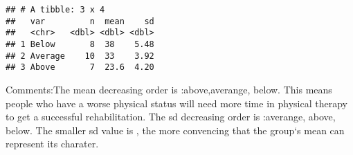 \documentclass[]{article}
\newenvironment{Shaded}{\begin{snugshade}}{\end{snugshade}}
\newcommand{\KeywordTok}[1]{\textcolor[rgb]{0.13,0.29,0.53}{\textbf{#1}}}
\newcommand{\DataTypeTok}[1]{\textcolor[rgb]{0.13,0.29,0.53}{#1}}
\newcommand{\DecValTok}[1]{\textcolor[rgb]{0.00,0.00,0.81}{#1}}
\newcommand{\StringTok}[1]{\textcolor[rgb]{0.31,0.60,0.02}{#1}}
\newcommand{\OtherTok}[1]{\textcolor[rgb]{0.56,0.35,0.01}{#1}}
\newcommand{\OperatorTok}[1]{\textcolor[rgb]{0.81,0.36,0.00}{\textbf{#1}}}
\newcommand{\NormalTok}[1]{#1}
\begin{document}
\begin{Shaded}
\end{Shaded}

\begin{verbatim}
## # A tibble: 3 x 4
##   var         n  mean    sd
##   <chr>   <dbl> <dbl> <dbl>
## 1 Below       8  38    5.48
## 2 Average    10  33    3.92
## 3 Above       7  23.6  4.20
\end{verbatim}

Comments:The mean decreasing order is :above,averange, below. This means
people who have a worse physical status will need more time in physical
therapy to get a successful rehabilitation. The sd decreasing order is
:averange, above, below. The smaller sd value is , the more convencing
that the group`s mean can represent its charater.
\end{document}
